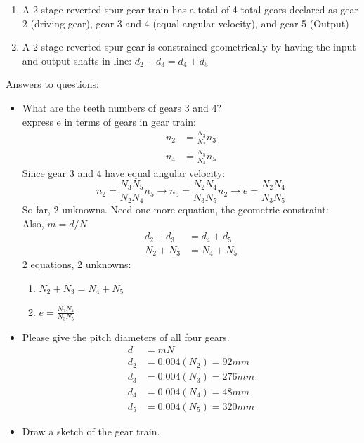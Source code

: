 \documentclass[11pt]{article}
\begin{document}
\begin{enumerate}
\begin{enumerate}
        \item A 2 stage reverted spur-gear train has a total of 4 total gears declared as gear 2 (driving gear), gear 3 and 4 (equal angular velocity), and gear 5 (Output)
        \item A 2 stage reverted spur-gear is constrained geometrically by having the input and output shafts in-line: $d_2+d_3=d_4+d_5$
    \end{enumerate}
    Answers to questions:
    \begin{itemize}
        \item What are the teeth numbers of gears 3 and 4?
        \\
        express e in terms of gears in gear train:
        \begin{align*}
            n_2 &= \frac{N_3}{N_2}n_3
            \\
            n_4 &= \frac{N_5}{N_4}n_5
        \end{align*}
        Since gear 3 and 4 have equal angular velocity:
            $$n_2 = \frac{N_3N_5}{N_2N_4}n_5 \rightarrow n_5 = \frac{N_2N_4}{N_3N_5}n_2 \rightarrow e = \frac{N_2N_4}{N_3N_5}$$
        So far, 2 unknowns. Need one more equation, the geometric constraint:
        \\
        Also, $m = d/N$
        \begin{align*}
            d_2+d_3&=d_4+d_5
            \\
            N_2+N_3&=N_4+N_5
        \end{align*}
        2 equations, 2 unknowns:
        \begin{enumerate}
            \item $N_2+N_3=N_4+N_5$
            \item $e = \frac{N_2N_4}{N_3N_5}$
        \end{enumerate}
        \item Please give the pitch diameters of all four gears.
        \begin{align*}
            d &= mN
            \\
            d_2 &= 0.004(N_2) = 92 mm
            \\
            d_3 &= 0.004(N_3) = 276 mm
            \\
            d_4 &= 0.004(N_4) = 48 mm
            \\
            d_5 &= 0.004(N_5) = 320 mm  
        \end{align*}
        \item Draw a sketch of the gear train.

\end{itemize}
\end{enumerate}
\end{document}
